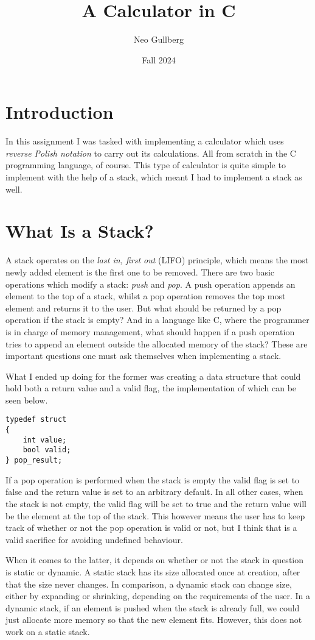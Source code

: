 \documentclass[a4paper, 11pt]{article}
\begin{document}
\title{
	\textbf{A Calculator in C}
}
\author{Neo Gullberg}
\date{Fall 2024}
\maketitle

\section{Introduction}
	In this assignment I was tasked with implementing a calculator which uses \textit{reverse Polish notation} to carry out its calculations.
	All from scratch in the C programming language, of course.
	This type of calculator is quite simple to implement with the help of a stack, which meant I had to implement a stack as well.

\section{What Is a Stack?}
	A stack operates on the \textit{last in, first out} (LIFO) principle, which means the most newly added element is the first one to be removed.
	There are two basic operations which modify a stack: \textit{push} and \textit{pop}.
	A push operation appends an element to the top of a stack, whilst a pop operation removes the top most element and returns it to the user.
	But what should be returned by a pop operation if the stack is empty?
	And in a language like C, where the programmer is in charge of memory management,
	what should happen if a push operation tries to append an element outside the allocated memory of the stack?
	These are important questions one must ask themselves when implementing a stack.
	\par
	What I ended up doing for the former was creating a data structure that could hold both a return value and a valid flag, the implementation of which can be seen below.
	\begin{verbatim}
typedef struct
{
	int value;
	bool valid;
} pop_result;
	\end{verbatim}
	If a pop operation is performed when the stack is empty the valid flag is set to false and the return value is set to an arbitrary default.
	In all other cases, when the stack is not empty, the valid flag will be set to true and the return value will be the element at the top of the stack.
	This however means the user has to keep track of whether or not the pop operation is valid or not, but I think that is a valid sacrifice for avoiding undefined behaviour.
	\par
	When it comes to the latter, it depends on whether or not the stack in question is static or dynamic.
	A static stack has its size allocated once at creation, after that the size never changes.
	In comparison, a dynamic stack can change size, either by expanding or shrinking, depending on the requirements of the user.
	In a dynamic stack, if an element is pushed when the stack is already full, we could just allocate more memory so that the new element fits.
	However, this does not work on a static stack.
\end{document}
